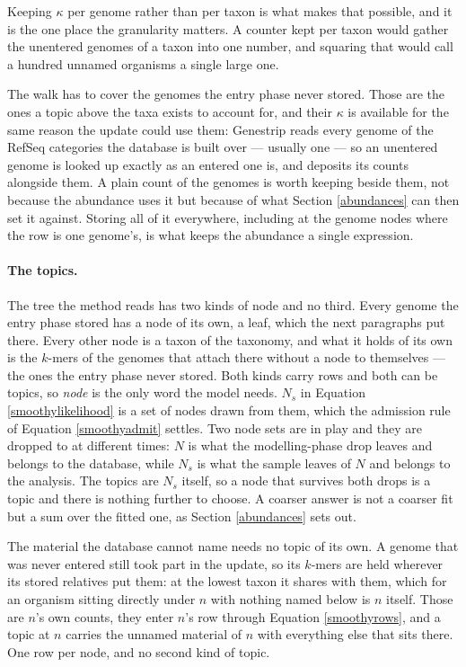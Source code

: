 \documentclass[pdflatex,sn-vancouver-num]{sn-jnl}
\begin{document}
    Keeping $\kappa$ per genome rather than per taxon is what makes that possible, and it is the one
    place the granularity matters. A counter kept per taxon would gather the unentered genomes of a
    taxon into one number, and squaring that would call a hundred unnamed organisms a single large
    one.

    The walk has to cover the genomes the entry phase never stored. Those are the ones a topic above
    the taxa exists to account for, and their $\kappa$ is available for the same reason the update
    could use them: Genestrip reads every genome of the RefSeq categories the database is built over
    --- usually one --- so an unentered genome is looked up exactly as an entered one is, and
    deposits its counts alongside them. A plain count of the genomes is worth keeping
    beside them, not because the abundance uses it but because of what Section \ref{abundances} can
    then set it against. Storing all of it everywhere, including at the genome nodes where the row is one
    genome's, is what keeps the abundance a single expression.

    \paragraph{The topics.} The tree the method reads has two kinds of node and no third. Every
    genome the entry phase stored has a node of its own, a leaf, which the next paragraphs put there.
    Every other node is a taxon of the taxonomy, and what it holds of its own is the $k$-mers of the
    genomes that attach there without a node to themselves --- the ones the entry phase never stored.
    Both kinds carry rows and both can be topics, so \emph{node} is the only word the model needs. $N_s$ in
    Equation \eqref{smoothylikelihood} is a set of nodes drawn from them, which the admission rule of
    Equation \eqref{smoothyadmit} settles. Two node sets are in play and they are dropped to at
    different times: $N$ is what the modelling-phase drop leaves and belongs to the database, while
    $N_s$ is what the sample leaves of $N$ and belongs to the analysis. The topics are $N_s$ itself,
    so a node that survives both drops is a topic and there is nothing further to choose. A coarser answer is not a coarser
    fit but a sum over the fitted one, as Section \ref{abundances} sets out.

    The material the database cannot name needs no topic of its own. A genome that was never entered
    still took part in the update, so its $k$-mers are held wherever its stored relatives put them:
    at the lowest taxon it shares with them, which for an organism sitting directly under $n$ with
    nothing named below is $n$ itself. Those are $n$'s own counts, they enter $n$'s row through
    Equation \eqref{smoothyrows}, and a topic at $n$ carries the unnamed material of $n$ with
    everything else that sits there. One row per node, and no second kind of topic.
\end{document}
